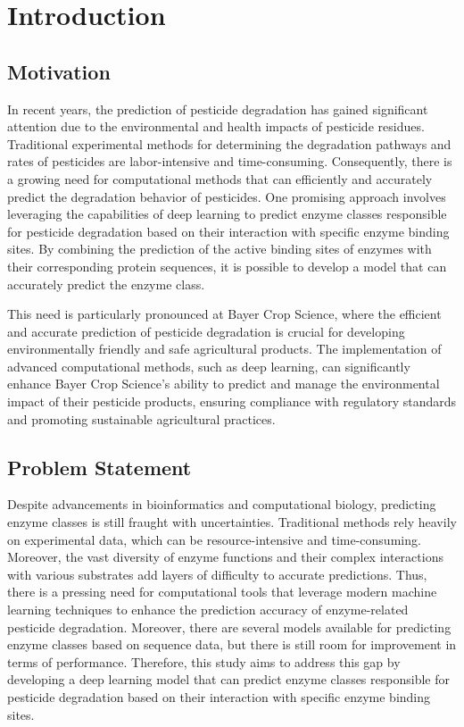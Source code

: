\section{Introduction}

\subsection{Motivation}
\label{sec:Motivation}

In recent years, the prediction of pesticide degradation has gained significant attention due to the environmental and health impacts of pesticide residues. Traditional experimental methods for determining the degradation pathways and rates of pesticides are labor-intensive and time-consuming. Consequently, there is a growing need for computational methods that can efficiently and accurately predict the degradation behavior of pesticides. One promising approach involves leveraging the capabilities of deep learning to predict enzyme classes responsible for pesticide degradation based on their interaction with specific enzyme binding sites. By combining the prediction of the active binding sites of enzymes with their corresponding protein sequences, it is possible to develop a model that can accurately predict the enzyme class.

This need is particularly pronounced at Bayer Crop Science, where the efficient and accurate prediction of pesticide degradation is crucial for developing environmentally friendly and safe agricultural products. The implementation of advanced computational methods, such as deep learning, can significantly enhance Bayer Crop Science's ability to predict and manage the environmental impact of their pesticide products, ensuring compliance with regulatory standards and promoting sustainable agricultural practices.


\subsection{Problem Statement}
\label{sec:Problem Statement}

Despite advancements in bioinformatics and computational biology, predicting enzyme classes is still fraught with uncertainties. Traditional methods rely heavily on experimental data, which can be resource-intensive and time-consuming. Moreover, the vast diversity of enzyme functions and their complex interactions with various substrates add layers of difficulty to accurate predictions. Thus, there is a pressing need for computational tools that leverage modern machine learning techniques to enhance the prediction accuracy of enzyme-related pesticide degradation. Moreover, there are several models available for predicting enzyme classes based on sequence data, but there is still room for improvement in terms of performance. Therefore, this study aims to address this gap by developing a deep learning model that can predict enzyme classes responsible for pesticide degradation based on their interaction with specific enzyme binding sites.

